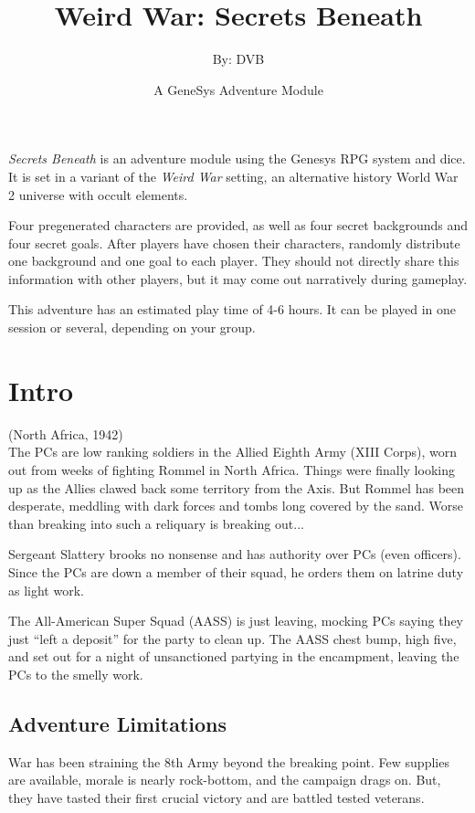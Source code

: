 \documentclass{book}
\title{Weird War: Secrets Beneath}
\author{By: DVB}
\date{A GeneSys Adventure Module}
\newcommand{\gb}{\emph{Secrets Beneath} }
\begin{document}
\maketitle

\begin{multicols}{2}

\gb is an adventure module using the Genesys RPG system and dice.  It is set in a variant of the \emph{Weird War} setting, an alternative history World War 2 universe with occult elements.

Four pregenerated characters are provided, as well as four secret backgrounds and four secret goals.  After players have chosen their characters, randomly distribute one background and one goal to each player.  They should not directly share this information with other players, but it may come out narratively during gameplay.

This adventure has an estimated play time of 4-6 hours.  It can be played in one session or several, depending on your group.

\section{Intro}
(North Africa, 1942)\\

    The PCs are low ranking soldiers in the Allied Eighth Army (XIII Corps), worn out from weeks of fighting Rommel in North Africa.  Things were finally looking up as the Allies clawed back some territory from the Axis.  But Rommel has been desperate, meddling with dark forces and tombs long covered by the sand.  Worse than breaking into such a reliquary is breaking out...

    Sergeant Slattery brooks no nonsense and has authority over PCs (even officers).  Since the PCs are down a member of their squad, he orders them on latrine duty as light work.

    The All-American Super Squad (AASS) is just leaving, mocking PCs saying they just ``left a deposit'' for the party to clean up.  The AASS chest bump, high five, and set out for a night of unsanctioned partying in the encampment, leaving the PCs to the smelly work.

\subsection{Adventure Limitations}

    War has been straining the 8th Army beyond the breaking point.  Few supplies are available, morale is nearly rock-bottom, and the campaign drags on.  But, they have tasted their first crucial victory and are battled tested veterans.
    

\end{multicols}
\end{document}
